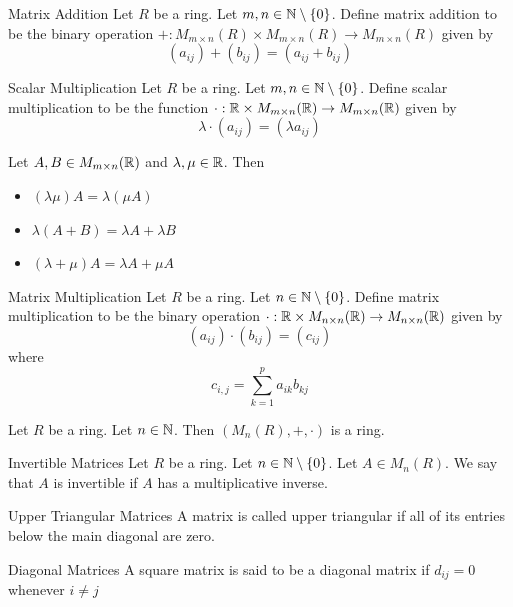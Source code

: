 \documentclass[a4paper]{article}
\begin{document}
\begin{defn}{Matrix Addition}{} Let $R$ be a ring. Let $m,n\in\mathbb{N}\setminus\{0\}$. Define matrix addition to be the binary operation $+:M_{m\times n}(R)\times M_{m\times n}(R)\to M_{m\times n}(R)$ given by $$(a_{ij})+(b_{ij})=(a_{ij}+b_{ij})$$
\end{defn}

\begin{defn}{Scalar Multiplication}{} Let $R$ be a ring. Let $m,n\in\mathbb{N}\setminus\{0\}$. Define scalar multiplication to be the function $\cdot:\mathbb{R}\times M_{m\times n}(\mathbb{R})\to M_{m\times n}(\mathbb{R})$ given by $$\lambda\cdot(a_{ij})=(\lambda a_{ij})$$
\end{defn}

\begin{prp}{}{} Let $A,B\in M_{m\times n}(\mathbb{R})$ and $\lambda,\mu\in\mathbb{R}$. Then
\begin{itemize}
\item $(\lambda\mu)A=\lambda(\mu A)$
\item $\lambda(A+B)=\lambda A+\lambda B$
\item $(\lambda+\mu)A=\lambda A+\mu A$
\end{itemize}
\end{prp}

\begin{defn}{Matrix Multiplication}{} Let $R$ be a ring. Let $n\in\mathbb{N}\setminus\{0\}$. Define matrix multiplication to be the binary operation $\cdot:\mathbb{R}\times M_{n\times n}(\mathbb{R})\to M_{n\times n}(\mathbb{R})$ given by $$(a_{ij})\cdot(b_{ij})=(c_{ij})$$ where $$c_{i,j}=\sum_{k=1}^pa_{ik}b_{kj}$$
\end{defn}

\begin{prp}{}{} Let $R$ be a ring. Let $n\in\mathbb{N}$. Then $(M_n(R),+,\cdot)$ is a ring. 
\end{prp}

\begin{defn}{Invertible Matrices}{} Let $R$ be a ring. Let $n\in\mathbb{N}\setminus\{0\}$. Let $A\in M_n(R)$. We say that $A$ is invertible if $A$ has a multiplicative inverse. 
\end{defn}

\begin{defn}{Upper Triangular Matrices}{} A matrix is called upper triangular if all of its entries below the main diagonal are zero. 
\end{defn}

\begin{defn}{Diagonal Matrices}{} A square matrix is said to be a diagonal matrix if $d_{ij}=0$ whenever $i\neq j$
\end{defn}
\end{document}
